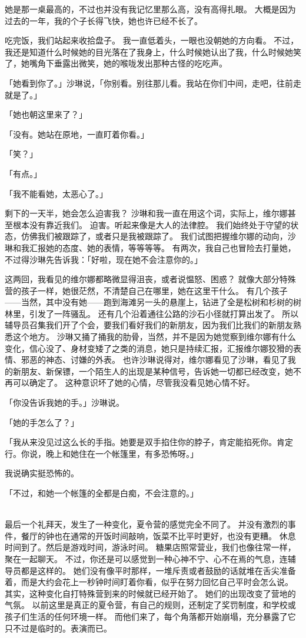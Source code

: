 \documentclass[UTF8]{ctexart}
\begin{document}
她是那一桌最高的，不过也并没有我记忆里那么高，没有高得扎眼。
大概是因为过去的一年，我的个子长得飞快，她也许已经不长了。

吃完饭，我们站起来收拾盘子。
我一直低着头，一眼也没朝她的方向看。
不过，我还是知道什么时候她的目光落在了我身上，什么时候她认出了我，什么时候她笑了，她嘴角下垂露出微笑，她的喉咙发出那种古怪的吃吃声。

「她看到你了。」沙琳说，「你别看。别往那儿看。我站在你们中间，走吧，往前走就是了。」

「她也朝这里来了？」

「没有。她站在原地，一直盯着你看。」

「笑？」

「有点。」

「我不能看她，太恶心了。」

剩下的一天半，她会怎么迫害我？
沙琳和我一直在用这个词，实际上，维尔娜甚至根本没有靠近我们。
迫害。听起来像是大人的法律腔。
我们始终处于守望的状态，仿佛我们被跟踪了，或者只是我被跟踪了。
我们试图把握维尔娜的动向，沙琳和我汇报她的态度、她的表情，等等等等。
有两次，我自己也冒险去打量她，不过得沙琳先告诉我：「好啦，现在她不会注意你的。」

这两回，我看见的维尔娜都略微显得沮丧，或者说愠怒、困惑？
就像大部分特殊营的孩子一样，她很茫然，不清楚自己在哪里，她在这里干什么。
有几个孩子——当然，其中没有她——跑到海滩另一头的悬崖上，钻进了全是松树和杉树的树林里，引发了一阵骚乱。
还有几个沿着通往公路的沙石小径就打算出发了。
所以辅导员召集我们开了个会，要我们看好我们的新朋友，因为我们比我们的新朋友熟悉这个地方。
沙琳又捅了捅我的肋骨，当然，并不是因为她觉察到维尔娜有什么变化，信心没了、身材变矮了之类的消息，她只是持续汇报，汇报维尔娜狡猾的表情、邪恶的神态、讨嫌的外表。
也许沙琳说得对，维尔娜看见了沙琳，看见了我的新朋友、新保镖，一个陌生人的出现是某种信号，告诉她一切都已经改变，她不再可以确定了。
这种意识坏了她的心情，尽管我没看见她心情不好。

「你没告诉我她的手。」沙琳说。

「她的手怎么了？」

「我从来没见过这么长的手指。她要是双手掐住你的脖子，肯定能掐死你。肯定行。你说，晚上和她住在一个帐篷里，有多恐怖呀。」

我说确实挺恐怖的。

「不过，和她一个帐篷的全都是白痴，不会注意的。」

~\\

最后一个礼拜天，发生了一种变化，夏令营的感觉完全不同了。
并没有激烈的事件，餐厅的钟也在通常的开饭时间敲响，饭菜不比平时更好，也没有更糟。
休息时间到了。然后是游戏时间，游泳时间。
糖果店照常营业，我们也像往常一样，聚在一起聊天。
不过，你还是可以感觉到一种心神不宁、心不在焉的气息，连辅导员都是这样的。
她们没有像平时那样，一堆斥责或者鼓励的话就堆在舌尖准备着，而是大约会花上一秒钟时间盯着你看，似乎在努力回忆自己平时会怎么说。
其实，这种变化自打特殊营到来的时候就已经开始了。
她们的出现改变了营地的气氛。
以前这里是真正的夏令营，有自己的规则，还制定了奖罚制度，和学校或孩子们生活的任何环境一样。
而他们来了，每个角落都开始崩塌，充分暴露了它只不过是临时的。表演而已。
\end{document}
